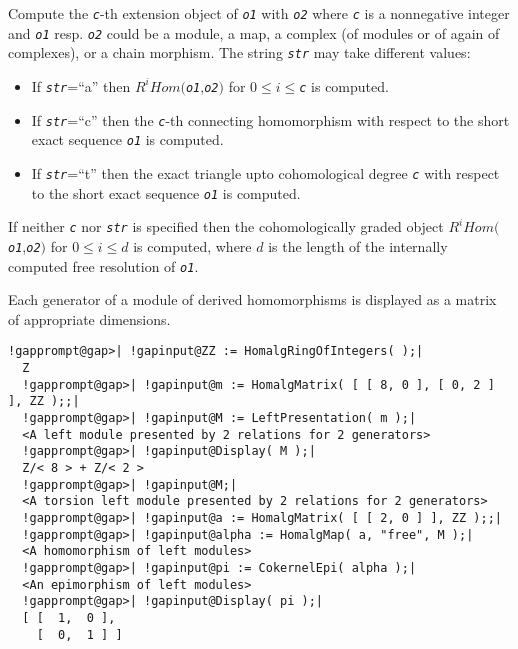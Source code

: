 \documentclass[a4paper,11pt]{report}
\begin{document}
{{{ Compute the \mbox{\texttt{\mdseries\slshape c}}-th extension object of \mbox{\texttt{\mdseries\slshape o1}} with \mbox{\texttt{\mdseries\slshape o2}} where \mbox{\texttt{\mdseries\slshape c}} is a nonnegative integer and \mbox{\texttt{\mdseries\slshape o1}} resp. \mbox{\texttt{\mdseries\slshape o2}} could be a module, a map, a complex (of modules or of again of complexes), or
a chain morphism. The string \mbox{\texttt{\mdseries\slshape str}} may take different values: 
\begin{itemize}
\item If \mbox{\texttt{\mdseries\slshape str}}=``a'' then $R^i Hom($\mbox{\texttt{\mdseries\slshape o1}},\mbox{\texttt{\mdseries\slshape o2}}$)$ for $0 \leq i \leq$\mbox{\texttt{\mdseries\slshape c}} is computed.
\item If \mbox{\texttt{\mdseries\slshape str}}=``c'' then the \mbox{\texttt{\mdseries\slshape c}}-th connecting homomorphism with respect to the short exact sequence \mbox{\texttt{\mdseries\slshape o1}} is computed.
\item If \mbox{\texttt{\mdseries\slshape str}}=``t'' then the exact triangle upto cohomological degree \mbox{\texttt{\mdseries\slshape c}} with respect to the short exact sequence \mbox{\texttt{\mdseries\slshape o1}} is computed.
\end{itemize}
 If neither \mbox{\texttt{\mdseries\slshape c}} nor \mbox{\texttt{\mdseries\slshape str}} is specified then the cohomologically graded object $R^i Hom($\mbox{\texttt{\mdseries\slshape o1}},\mbox{\texttt{\mdseries\slshape o2}}$)$ for $0 \leq i \leq d$ is computed, where $d$ is the length of the internally computed free resolution of \mbox{\texttt{\mdseries\slshape o1}}. 

 Each generator of a module of derived homomorphisms is displayed as a matrix
of appropriate dimensions. 
\begin{Verbatim}[commandchars=!@|,fontsize=\small,frame=single,label=Example]
  !gapprompt@gap>| !gapinput@ZZ := HomalgRingOfIntegers( );|
  Z
  !gapprompt@gap>| !gapinput@m := HomalgMatrix( [ [ 8, 0 ], [ 0, 2 ] ], ZZ );;|
  !gapprompt@gap>| !gapinput@M := LeftPresentation( m );|
  <A left module presented by 2 relations for 2 generators>
  !gapprompt@gap>| !gapinput@Display( M );|
  Z/< 8 > + Z/< 2 >
  !gapprompt@gap>| !gapinput@M;|
  <A torsion left module presented by 2 relations for 2 generators>
  !gapprompt@gap>| !gapinput@a := HomalgMatrix( [ [ 2, 0 ] ], ZZ );;|
  !gapprompt@gap>| !gapinput@alpha := HomalgMap( a, "free", M );|
  <A homomorphism of left modules>
  !gapprompt@gap>| !gapinput@pi := CokernelEpi( alpha );|
  <An epimorphism of left modules>
  !gapprompt@gap>| !gapinput@Display( pi );|
  [ [  1,  0 ],
    [  0,  1 ] ]
  

\end{Verbatim}}}}
\end{document}
